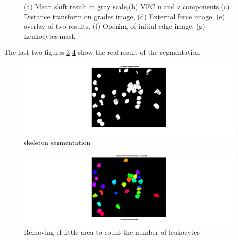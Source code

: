 \begin{figure}[htbp]
\begin{subfigure}[b]{0.4\textwidth}
        \caption{ }
        \label{fig:fig7}
    \end{subfigure}

    
    \caption{(a) Mean shift result in gray scale,(b) VFC u and v components,(c) Distance transform on grades image, (d) External force image, (e) overlay of two results, (f) Opening of initial edge image, (g) Leukocytes mask}
    \label{fig:alltheprocess}
\end{figure}
The last two figures \ref{fig:fig8} \ref{fig:fig9} show the real result of the segmentation

\begin{figure}
\centering
	\begin{center}
		\includegraphics[width=\textwidth]{img/final/figure8.png}
		\caption{skeleton segmentation}
		\label{fig:fig8}
	\end{center}
\end{figure}
\begin{figure}
\centering
	\begin{center}
		\includegraphics[width=\textwidth]{img/final/figure9.png}
		\caption{Removing of little area to count the number of leukocytes}
		\label{fig:fig9}
	\end{center}
\end{figure}
\bigskip


